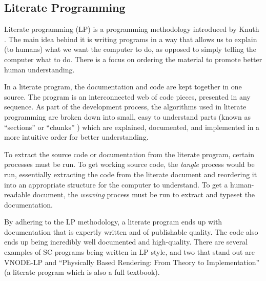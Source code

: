 \documentclass{sig-alternate-05-2015}
\begin{document}

\subsection{Literate Programming} \label{ssec:literate}

Literate programming (LP) is a programming methodology introduced by Knuth
\cite{Knuth1984}. The main idea behind it is writing programs in a way that
allows us to explain (to humans) what we want the computer to do, as opposed to
simply telling the computer what to do. There is a focus on ordering the
material to promote better human understanding.

In a literate program, the documentation and code are kept together in one
source. The program is an interconnected web of code pieces, presented in any
sequence. As part of the development process, the algorithms used in literate
programming are broken down into small, easy to understand parts (known as
``sections'' \cite{Knuth1984} or ``chunks'' \cite{JohnsonAndJohnson1997}) which are
explained, documented, and implemented in a more intuitive order for better
understanding.

To extract the source code or documentation from the literate program, certain
processes must be run. To get working source code, the \textit{tangle} process
would be run, essentially extracting the code from the literate document and
reordering it into an appropriate structure for the computer to understand.  To
get a human-readable document, the \textit{weaving} process must be run to
extract and typeset the documentation.

By adhering to the LP methodology, a literate program ends up with documentation
that is expertly written and of publishable quality. The code also ends up being
incredibly well documented and high-quality. There are several examples of SC
programs being written in LP style, and two that stand out are VNODE-LP
\cite{Nedialkov2006} and ``Physically Based Rendering: From Theory to
Implementation'' \cite{PharrAndHumphreys2004} (a literate program which is also
a full textbook).
\end{document}
